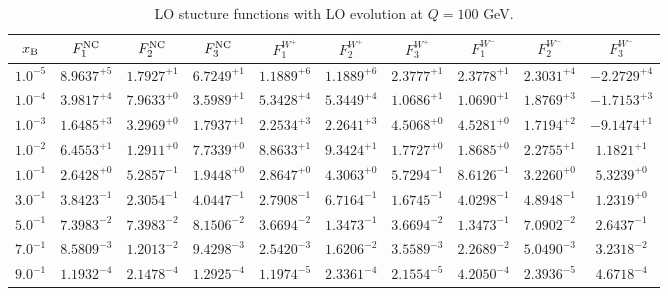 \begin{table}[h]
\begin{adjustbox}{width=\textwidth}
\begin{tabular}{|c||c|c|c|c|c|c|c|c|c|}
\hline
$x_{\rm B}$ & $F_1^{\rm NC}$ & $F_2^{\rm NC}$ & $F_3^{\rm NC}$ & $F_1^{W^+}$ & $F_2^{W^+}$ & $F_3^{W^+}$ & $F_1^{W^-}$ & $F_2^{W^-}$ & $F_3^{W^-}$ \\
\hline
$ 1.0^{-5}$ & $ 8.9637^{+5}$ & $ 1.7927^{+1}$ & $ 6.7249^{+1}$ & $ 1.1889^{+6}$ & $ 1.1889^{+6}$ & $ 2.3777^{+1}$ & $ 2.3778^{+1}$ & $ 2.3031^{+4}$ & $-2.2729^{+4}$ \\
$ 1.0^{-4}$ & $ 3.9817^{+4}$ & $ 7.9633^{+0}$ & $ 3.5989^{+1}$ & $ 5.3428^{+4}$ & $ 5.3449^{+4}$ & $ 1.0686^{+1}$ & $ 1.0690^{+1}$ & $ 1.8769^{+3}$ & $-1.7153^{+3}$ \\
$ 1.0^{-3}$ & $ 1.6485^{+3}$ & $ 3.2969^{+0}$ & $ 1.7937^{+1}$ & $ 2.2534^{+3}$ & $ 2.2641^{+3}$ & $ 4.5068^{+0}$ & $ 4.5281^{+0}$ & $ 1.7194^{+2}$ & $-9.1474^{+1}$ \\
$ 1.0^{-2}$ & $ 6.4553^{+1}$ & $ 1.2911^{+0}$ & $ 7.7339^{+0}$ & $ 8.8633^{+1}$ & $ 9.3424^{+1}$ & $ 1.7727^{+0}$ & $ 1.8685^{+0}$ & $ 2.2755^{+1}$ & $ 1.1821^{+1}$ \\
$ 1.0^{-1}$ & $ 2.6428^{+0}$ & $ 5.2857^{-1}$ & $ 1.9448^{+0}$ & $ 2.8647^{+0}$ & $ 4.3063^{+0}$ & $ 5.7294^{-1}$ & $ 8.6126^{-1}$ & $ 3.2260^{+0}$ & $ 5.3239^{+0}$ \\
$ 3.0^{-1}$ & $ 3.8423^{-1}$ & $ 2.3054^{-1}$ & $ 4.0447^{-1}$ & $ 2.7908^{-1}$ & $ 6.7164^{-1}$ & $ 1.6745^{-1}$ & $ 4.0298^{-1}$ & $ 4.8948^{-1}$ & $ 1.2319^{+0}$ \\
$ 5.0^{-1}$ & $ 7.3983^{-2}$ & $ 7.3983^{-2}$ & $ 8.1506^{-2}$ & $ 3.6694^{-2}$ & $ 1.3473^{-1}$ & $ 3.6694^{-2}$ & $ 1.3473^{-1}$ & $ 7.0902^{-2}$ & $ 2.6437^{-1}$ \\
$ 7.0^{-1}$ & $ 8.5809^{-3}$ & $ 1.2013^{-2}$ & $ 9.4298^{-3}$ & $ 2.5420^{-3}$ & $ 1.6206^{-2}$ & $ 3.5589^{-3}$ & $ 2.2689^{-2}$ & $ 5.0490^{-3}$ & $ 3.2318^{-2}$ \\
$ 9.0^{-1}$ & $ 1.1932^{-4}$ & $ 2.1478^{-4}$ & $ 1.2925^{-4}$ & $ 1.1974^{-5}$ & $ 2.3361^{-4}$ & $ 2.1554^{-5}$ & $ 4.2050^{-4}$ & $ 2.3936^{-5}$ & $ 4.6718^{-4}$ \\
\hline
\end{tabular}
\end{adjustbox}\caption{LO stucture functions with LO evolution at $Q = 100$ GeV.}
\label{tab:N0LO-Q100}
\end{table}


